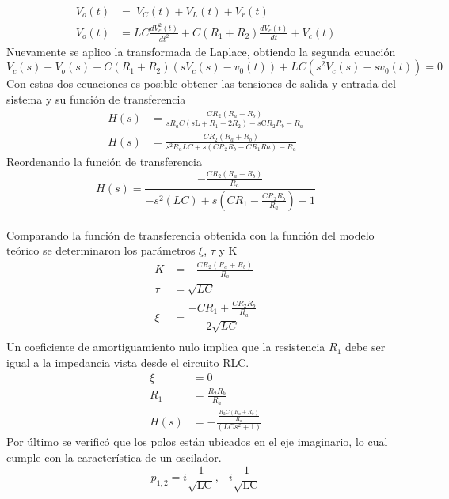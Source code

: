 \documentclass[10pt,a4paper]{article} %
\begin{document}
\begin{align*}
 V_{o}(t)&=\ V_{C}(t)+ V_{L}(t)+ V_{r}(t)\\
V_{o}(t)&=LC\frac{d V_{c}^{2}(t)}{dt^{2}}+ C(R_{1}+R_{2})\frac{d V_{c}(t)}{dt}+V_{c}(t)
\end{align*}
Nuevamente se aplico la transformada de Laplace, obtiendo la segunda ecuación
\begin{equation}
V_{c}(s) - V_{o}(s) + C(R_{1} + R_{2})(sV_{c}(s) - v_{0}(t)) + 
LC(s^{2}V_{c}(s) - sv_{0}(t)) = 0
\end{equation}
Con estas dos ecuaciones es posible obtener las tensiones de salida y entrada del sistema y su función de transferencia 
\begin{align*}
H(s)&=\frac{C R_{2} (R_{a}+R_{b})}{sR_{a}C (s\text{L} +R_{1}+2 R_{2})-s\text{C}R_{2} R_{b} -R_{a}}\\
H(s)&=\frac{CR_2(R_a+R_b)}{s^2R_aLC+s(CR_2R_b-CR_1Ra)-R_a}
\end{align*}
Reordenando la función de transferencia
\begin{equation*}
H(s)=\frac{-\frac{CR_{2}(R_{a}+R_{b})}{R_{a}}}{-s^{2}(LC)+s(CR_1-\frac{CR_2R_b}{R_a})+1}
\end{equation*}
\\
Comparando la función de transferencia obtenida con la función del modelo teórico se determinaron los parámetros $\xi$, $\tau$ y K
\begin{align*}
K&=-\frac{CR_{2}(R_{a}+R_{b})}{R_{a}}\\
\tau&=\sqrt{LC}\\
\xi&=\dfrac{-CR_{1}+\frac{CR_{2}R_{b}}{R_{a}}}{2\sqrt{LC}}\\
\end{align*}
Un coeficiente de amortiguamiento nulo implica que la resistencia $R_{1}$ debe ser igual a la impedancia vista desde el circuito RLC.
\begin{align*}
\xi&=0\\
R_{1}&=\frac{R_{2}R_{b}}{R_{a}}\\
H(s)&=-\frac{\frac{R_{2}C (R_{a}+R_{b})}{R_{a}}}{\left(LCs^2+1\right)}
\end{align*}
Por último se verificó que los polos están ubicados en el eje imaginario, lo cual cumple con la característica de un oscilador.
 \begin{equation*}
p_{1,2}=i\frac{1}{\sqrt{\text{L}\text{C}}},-i\frac{1}{\sqrt{\text{L}\text{C}}}
\end{equation*}
\end{document}
